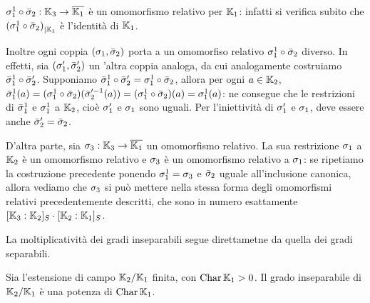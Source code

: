 \par $\sigma_1^1 \circ \bar{\sigma}_2: \mathbb{K}_3 \rightarrow \overline{\mathbb{K}_1}$ \`e un omomorfismo relativo per $\mathbb{K}_1$: infatti si verifica subito che ${(\sigma_1^1 \circ \bar{\sigma}_2)}_{|\mathbb{K}_1}$ \`e l'identit\`a di $\mathbb{K}_1$.
\par Inoltre ogni coppia $(\sigma_1,\bar{\sigma}_2)$ porta a un omomorfiso relativo $\sigma_1^1 \circ \bar{\sigma}_2$ diverso. In effetti, sia $(\sigma_1',\bar{\sigma}_2')$ un 'altra coppia analoga, da cui analogamente costruiamo $\bar{\sigma}_1^1 \circ \bar{\sigma}_2'$. Supponiamo $\bar{\sigma}_1^1 \circ \bar{\sigma}_2' = \sigma_1^1 \circ \bar{\sigma}_2$, allora per ogni $a \in \mathbb{K}_2$, $\bar{\sigma}_1^1(a) = (\sigma_1^1 \circ \bar{\sigma}_2)(\bar{\sigma}_2'^{-1}(a)) = (\sigma_1^1 \circ \bar{\sigma}_2)(a) = \sigma_1^1(a)$: ne consegue che le restrizioni di $\bar{\sigma}_1^1$ e $\sigma_1^1$ a $\mathbb{K}_2$, cio\`e $\sigma_1'$ e $\sigma_1$ sono uguali. Per l'iniettivit\`a di $\sigma_1'$ e $\sigma_1$, deve essere anche $\bar{\sigma}_2' = \bar{\sigma}_2$.
\par D'altra parte, sia $\sigma_3: \mathbb{K}_3 \rightarrow \overline{\mathbb{K}_1}$ un omomorfismo relativo. La sua restrizione $\sigma_1$ a $\mathbb{K}_2$ \`e un omomorfismo relativo e $\sigma_3$ \`e un omomorfismo relativo a $\sigma_1$: se ripetiamo la costruzione precedente ponendo $\sigma_1^1 = \sigma_3$ e $\bar{\sigma}_2$ uguale all'inclusione canonica, allora vediamo che $\sigma_3$ si pu\`o mettere nella stessa forma degli omomorfismi relativi precedentemente descritti, che sono in numero esattamente $[\mathbb{K}_3:\mathbb{K}_2]_S \cdot [\mathbb{K}_2:\mathbb{K}_1]_S$.
\par La moltiplicativit\`a dei gradi inseparabili segue direttametne da quella dei gradi separabili. \EndProof
\begin{Theorem}
	Sia l'estensione di campo $\mathbb{K}_2/\mathbb{K}_1$ finita, con $\operatorname{Char}{\mathbb{K}_1} > 0$. Il grado inseparabile di $\mathbb{K}_2/\mathbb{K}_1$ \`e una potenza di $\operatorname{Char}{\mathbb{K}_1}$.
\end{Theorem}
